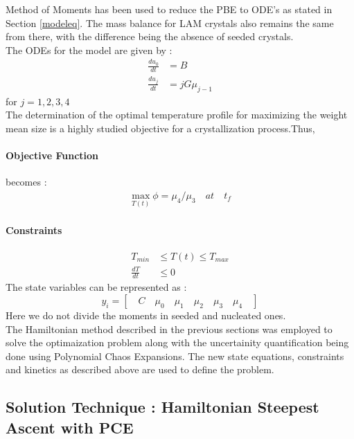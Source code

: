 \documentclass[3p,times,authoryear]{elsarticle}
\begin{document}
Method of Moments has been used to reduce the PBE to ODE's as stated in Section \ref{modeleq}. The mass balance for LAM crystals also remains the same from there, with the difference being the absence of seeded crystals.\\

The ODEs for the model are given by :
\begin{align}
\frac{du_{0}}{dt} &= B \\
\frac{du_{j}}{dt} &= jG\mu_{j-1}
\end{align}
for  $j = 1,2,3,4 $ \\
The determination of the optimal temperature profile for maximizing the weight mean size is a highly studied objective for a crystallization process.Thus, 
\paragraph{Objective Function} becomes :
\begin{align}
\max_{T(t)}	\phi = \mu_{4}/\mu_{3} \quad at \quad t_{f} 
\end{align}
\paragraph{Constraints}
\begin{align}
T_{min} &\leqslant T(t) \leqslant T_{max} \\
\frac{dT}{dt} &\leqslant 0
\end{align}
The state variables can be represented as :
\begin{equation*}
y_{i} = \left[\quad C \quad \mu_{0} \quad \mu_{1} \quad \mu_{2} \quad \mu_{3}\quad \mu_{4} \quad\right]  
\end{equation*}
Here we do not divide the moments in seeded and nucleated ones.\\
The Hamiltonian method described in the previous sections was employed to solve the optimaization problem along with the uncertainity quantification being done using Polynomial Chaos Expansions. The new state equations, constraints and kinetics as described above are used to define the problem.\\

\subsection{Solution Technique : Hamiltonian Steepest Ascent with PCE}
\end{document}
